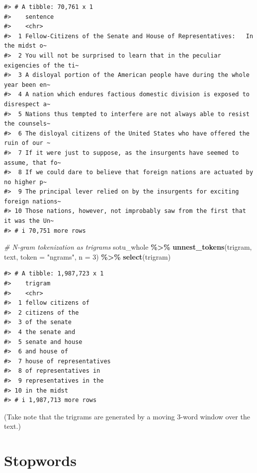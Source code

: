 \documentclass[
]{book}
\newenvironment{Shaded}{\begin{snugshade}}{\end{snugshade}}
\newcommand{\AttributeTok}[1]{\textcolor[rgb]{0.13,0.29,0.53}{#1}}
\newcommand{\CommentTok}[1]{\textcolor[rgb]{0.56,0.35,0.01}{\textit{#1}}}
\newcommand{\DecValTok}[1]{\textcolor[rgb]{0.00,0.00,0.81}{#1}}
\newcommand{\FunctionTok}[1]{\textcolor[rgb]{0.13,0.29,0.53}{\textbf{#1}}}
\newcommand{\NormalTok}[1]{#1}
\newcommand{\SpecialCharTok}[1]{\textcolor[rgb]{0.81,0.36,0.00}{\textbf{#1}}}
\newcommand{\StringTok}[1]{\textcolor[rgb]{0.31,0.60,0.02}{#1}}
\begin{document}
\begin{verbatim}
#> # A tibble: 70,761 x 1
#>    sentence                                                                     
#>    <chr>                                                                        
#>  1 Fellow-Citizens of the Senate and House of Representatives:   In the midst o~
#>  2 You will not be surprised to learn that in the peculiar exigencies of the ti~
#>  3 A disloyal portion of the American people have during the whole year been en~
#>  4 A nation which endures factious domestic division is exposed to disrespect a~
#>  5 Nations thus tempted to interfere are not always able to resist the counsels~
#>  6 The disloyal citizens of the United States who have offered the ruin of our ~
#>  7 If it were just to suppose, as the insurgents have seemed to assume, that fo~
#>  8 If we could dare to believe that foreign nations are actuated by no higher p~
#>  9 The principal lever relied on by the insurgents for exciting foreign nations~
#> 10 Those nations, however, not improbably saw from the first that it was the Un~
#> # i 70,751 more rows
\end{verbatim}

\begin{Shaded}
\begin{Highlighting}[]
\CommentTok{\# N{-}gram tokenization as trigrams}
\NormalTok{sotu\_whole }\SpecialCharTok{\%\textgreater{}\%}
  \FunctionTok{unnest\_tokens}\NormalTok{(trigram, text, }\AttributeTok{token =} \StringTok{"ngrams"}\NormalTok{, }\AttributeTok{n =} \DecValTok{3}\NormalTok{) }\SpecialCharTok{\%\textgreater{}\%} 
  \FunctionTok{select}\NormalTok{(trigram)}
\end{Highlighting}
\end{Shaded}

\begin{verbatim}
#> # A tibble: 1,987,723 x 1
#>    trigram                 
#>    <chr>                   
#>  1 fellow citizens of      
#>  2 citizens of the         
#>  3 of the senate           
#>  4 the senate and          
#>  5 senate and house        
#>  6 and house of            
#>  7 house of representatives
#>  8 of representatives in   
#>  9 representatives in the  
#> 10 in the midst            
#> # i 1,987,713 more rows
\end{verbatim}

(Take note that the trigrams are generated by a moving 3-word window over the text.)

\section{Stopwords}\label{stopwords}
\end{document}
